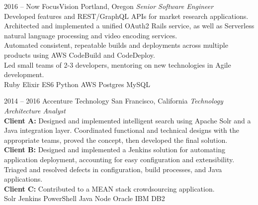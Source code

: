 \documentclass[]{friggeri-cv} %
\begin{document}
\begin{entrylist}


\entry
{2016 -- Now}
{FocusVision}
{Portland, Oregon}
{\emph{Senior Software Engineer} \\
    Developed features and REST/GraphQL APIs for market research applications.
    \\
    Architected and implemented a unified OAuth2 Rails service, as well as Serverless natural language processing and video encoding services.
    \\
    Automated consistent, repeatable builds and deployments across multiple products using AWS CodeBuild and CodeDeploy.
    \\
    Led small teams of 2-3 developers, mentoring on new technologies in Agile development.
    \\
Ruby \mydot Elixir \mydot ES6 \mydot Python \mydot AWS \mydot Postgres \mydot MySQL}

\entry
{2014 -- 2016}
{Accenture Technology}
{San Francisco, California}
{\emph{Technology Architecture Analyst} \\
    \textbf{Client A:} Designed and implemented intelligent search using Apache Solr and a Java integration layer. Coordinated functional and technical designs with the appropriate teams, proved the concept, then developed the final solution.
    \\
    \textbf{Client B:} Designed and implemented a Jenkins solution for automating application deployment, accounting for easy configuration and extensibility. Triaged and resolved defects in configuration, build processes, and Java applications.
    \\
    \textbf{Client C:} Contributed to a MEAN stack crowdsourcing application. \\
Solr \mydot Jenkins \mydot PowerShell \mydot Java \mydot Node \mydot Oracle \mydot IBM DB2}


\end{entrylist}
\end{document}
